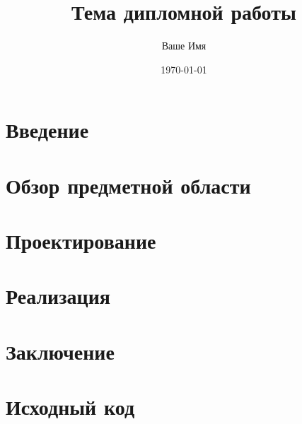 \documentclass[a4paper,12pt]{report} %
\title{Тема дипломной работы}
\author{Ваше Имя}
\date{\today}
\begin{document}
\maketitle
\tableofcontents

\chapter{Введение}

\chapter{Обзор предметной области}
% 

\chapter{Проектирование}
% 

\chapter{Реализация}
% 

\chapter{Заключение}
% 


\appendix
\chapter{Исходный код}
\end{document}
